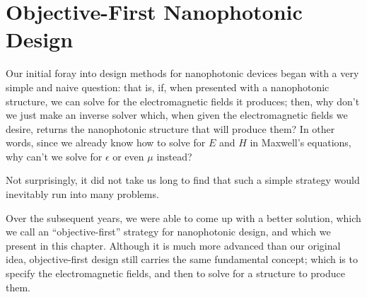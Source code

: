\newcommand{\BE}{\begin{equation}}
\newcommand{\EE}{\end{equation}}
\newcommand{\BA}{\begin{eqnarray}}
\newcommand{\EA}{\end{eqnarray}}
\newcommand{\curl}{\nabla\times}
\newcommand{\minimize}[1]{\JLUminimize_{#1}\;&}
\newcommand{\subto}{\text{subject to}\;&}

\newcommand{\myfig}[2]{\begin{figure}[!h]\texttt{[image: fig/\#1.jpg]}\caption{#2}\label{fig:#1}\end{figure}}

\newcommand{\BI}{\begin{itemize}\item}
\renewcommand{\I}{\item}
\newcommand{\EI}{\end{itemize}}

\newcommand{\ER}[1]{\eqref{eq:#1}}
\newcommand{\SR}[1]{Section~\ref{sec:#1}}
\newcommand{\sR}[1]{section~\ref{sec:#1}}
\newcommand{\FR}[1]{Figure~\ref{fig:#1}}
\newcommand{\fR}[1]{figure~\ref{fig:#1}}
\chapter{Objective-First Nanophotonic Design}
\label{intro}

    

Our initial foray into design methods for nanophotonic devices
    began with a very simple and naive question: that is,
    if, when presented with a nanophotonic structure,
    we can solve for the electromagnetic fields it produces;
    then, why don't we just make an inverse solver which,
    when given the electromagnetic fields we desire,
    returns the nanophotonic structure that will produce them? %
In other words, since we already know how to solve for $E$ and $H$ 
    in Maxwell's equations, why can't we solve for $\epsilon$
    or even $\mu$ instead?

Not surprisingly, it did not take us long to find that such
    a simple strategy would inevitably run into many problems.

Over the subsequent years, we were able to come up with a better solution,
    which we call an ``objective-first'' strategy for nanophotonic design,
    and which we present in this chapter.
Although it is much more advanced than our original idea,
    objective-first design still carries the same fundamental concept;
    which is to specify the electromagnetic fields, and then
    to solve for a structure to produce them.
    

